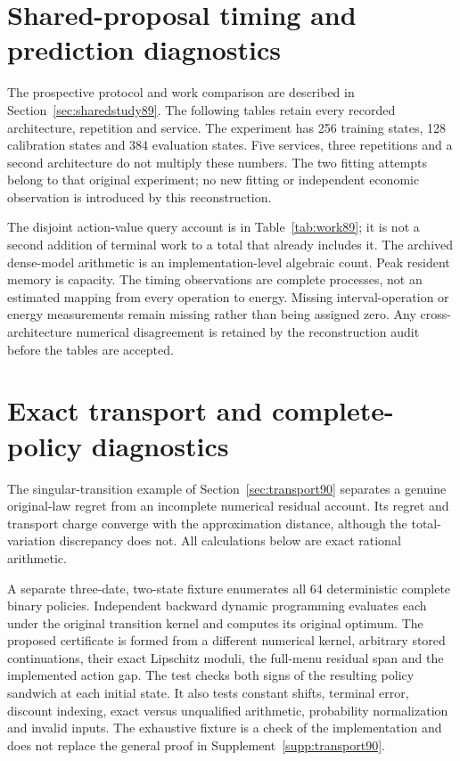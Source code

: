 \section{Shared-proposal timing and prediction diagnostics}\label{app:shared90}
The prospective protocol and work comparison are described in Section~\ref{sec:sharedstudy89}. The following tables retain every recorded architecture, repetition and service. The experiment has 256 training states, 128 calibration states and 384 evaluation states. Five services, three repetitions and a second architecture do not multiply these numbers. The two fitting attempts belong to that original experiment; no new fitting or independent economic observation is introduced by this reconstruction.





The disjoint action-value query account is in Table~\ref{tab:work89}; it is not a second addition of terminal work to a total that already includes it. The archived dense-model arithmetic is an implementation-level algebraic count. Peak resident memory is capacity. The timing observations are complete processes, not an estimated mapping from every operation to energy. Missing interval-operation or energy measurements remain missing rather than being assigned zero. Any cross-architecture numerical disagreement is retained by the reconstruction audit before the tables are accepted.

\section{Exact transport and complete-policy diagnostics}\label{app:transport90}
The singular-transition example of Section~\ref{sec:transport90} separates a genuine original-law regret from an incomplete numerical residual account. Its regret and transport charge converge with the approximation distance, although the total-variation discrepancy does not. All calculations below are exact rational arithmetic.



A separate three-date, two-state fixture enumerates all 64 deterministic complete binary policies. Independent backward dynamic programming evaluates each under the original transition kernel and computes its original optimum. The proposed certificate is formed from a different numerical kernel, arbitrary stored continuations, their exact Lipschitz moduli, the full-menu residual span and the implemented action gap. The test checks both signs of the resulting policy sandwich at each initial state. It also tests constant shifts, terminal error, discount indexing, exact versus unqualified arithmetic, probability normalization and invalid inputs. The exhaustive fixture is a check of the implementation and does not replace the general proof in Supplement~\ref{supp:transport90}.

